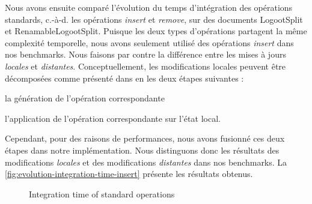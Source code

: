 \documentclass[12pt]{thesul}
\newcommand{\ie}{c.-à-d. }
\begin{document}
Nous avons ensuite comparé l'évolution du temps d'intégration des opérations standards, \ie les opérations \emph{insert} et \emph{remove}, sur des documents LogootSplit et RenamableLogootSplit.
Puisque les deux types d'opérations partagent la même complexité temporelle, nous avons seulement utilisé des opérations \emph{insert} dans nos benchmarks.
Nous faisons par contre la différence entre les mises à jours \emph{locales} et \emph{distantes}.
Conceptuellement, les modifications locales peuvent être décomposées comme présenté dans \cite{baquero2017pure} en les deux étapes suivantes :
\begin{enumerate*}[label=(\roman*)]
  \item la génération de l'opération correspondante
  \item l'application de l'opération correspondante sur l'état local.
\end{enumerate*}
Cependant, pour des raisons de performances, nous avons fusionné ces deux étapes dans notre implémentation.
Nous distinguons donc les résultats des modifications \emph{locales} et des modifications \emph{distantes} dans nos benchmarks.
La \autoref{fig:evolution-integration-time-insert} présente les résultats obtenus.

\begin{figure}[!ht]
  \centering
  \hfil
  \caption{Integration time of standard operations}
  \label{fig:evolution-integration-time-insert}
\end{figure}
\end{document}
